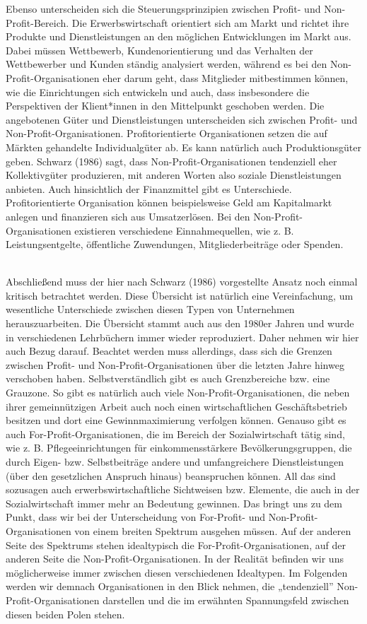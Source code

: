 \documentclass[
  letterpaper,
]{book}
\begin{document}
Ebenso unterscheiden sich die Steuerungsprinzipien zwischen Profit- und
Non-Profit-Bereich. Die Erwerbswirtschaft orientiert sich am Markt und
richtet ihre Produkte und Dienstleistungen an den möglichen
Entwicklungen im Markt aus. Dabei müssen Wettbewerb, Kundenorientierung
und das Verhalten der Wettbewerber und Kunden ständig analysiert werden,
während es bei den Non-Profit-Organisationen eher darum geht, dass
Mitglieder mitbestimmen können, wie die Einrichtungen sich entwickeln
und auch, dass insbesondere die Perspektiven der Klient*innen in den
Mittelpunkt geschoben werden. Die angebotenen Güter und Dienstleistungen
unterscheiden sich zwischen Profit- und Non-Profit-Organisationen.
Profitorientierte Organisationen setzen die auf Märkten gehandelte
Individualgüter ab. Es kann natürlich auch Produktionsgüter geben.
Schwarz (1986) sagt, dass Non-Profit-Organisationen tendenziell eher
Kollektivgüter produzieren, mit anderen Worten also soziale
Dienstleistungen anbieten. Auch hinsichtlich der Finanzmittel gibt es
Unterschiede. Profitorientierte Organisation können beispielsweise Geld
am Kapitalmarkt anlegen und finanzieren sich aus Umsatzerlösen. Bei den
Non-Profit-Organisationen existieren verschiedene Einnahmequellen, wie
z. B. Leistungsentgelte, öffentliche Zuwendungen, Mitgliederbeiträge
oder Spenden.\\
\strut \\
Abschließend muss der hier nach Schwarz (1986) vorgestellte Ansatz noch
einmal kritisch betrachtet werden. Diese Übersicht ist natürlich eine
Vereinfachung, um wesentliche Unterschiede zwischen diesen Typen von
Unternehmen herauszuarbeiten. Die Übersicht stammt auch aus den 1980er
Jahren und wurde in verschiedenen Lehrbüchern immer wieder reproduziert.
Daher nehmen wir hier auch Bezug darauf. Beachtet werden muss
allerdings, dass sich die Grenzen zwischen Profit- und
Non-Profit-Organisationen über die letzten Jahre hinweg verschoben
haben. Selbstverständlich gibt es auch Grenzbereiche bzw. eine Grauzone.
So gibt es natürlich auch viele Non-Profit-Organisationen, die neben
ihrer gemeinnützigen Arbeit auch noch einen wirtschaftlichen
Geschäftsbetrieb besitzen und dort eine Gewinnmaximierung verfolgen
können. Genauso gibt es auch For-Profit-Organisationen, die im Bereich
der Sozialwirtschaft tätig sind, wie z. B. Pflegeeinrichtungen für
einkommensstärkere Bevölkerungsgruppen, die durch Eigen- bzw.
Selbstbeiträge andere und umfangreichere Dienstleistungen (über den
gesetzlichen Anspruch hinaus) beanspruchen können. All das sind
sozusagen auch erwerbswirtschaftliche Sichtweisen bzw. Elemente, die
auch in der Sozialwirtschaft immer mehr an Bedeutung gewinnen. Das
bringt uns zu dem Punkt, dass wir bei der Unterscheidung von For-Profit-
und Non-Profit-Organisationen von einem breiten Spektrum ausgehen
müssen. Auf der anderen Seite des Spektrums stehen idealtypisch die
For-Profit-Organisationen, auf der anderen Seite die
Non-Profit-Organisationen. In der Realität befinden wir uns
möglicherweise immer zwischen diesen verschiedenen Idealtypen. Im
Folgenden werden wir demnach Organisationen in den Blick nehmen, die
„tendenziell'' Non-Profit-Organisationen darstellen und die im erwähnten
Spannungsfeld zwischen diesen beiden Polen stehen.
\end{document}
